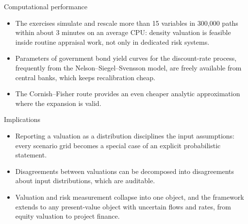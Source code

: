 \documentclass[aspectratio=169,11pt]{beamer}
\begin{document}
\begin{frame}{Computational performance}
  \begin{itemize}
    \item The exercises simulate and rescale more than 15 variables in
          300{,}000 paths within about 3 minutes on an average CPU: density
          valuation is feasible inside routine appraisal work, not only in
          dedicated risk systems.
    \item Parameters of government bond yield curves for the discount-rate
          process, frequently from the Nelson--Siegel--Svensson model, are
          freely available from central banks, which keeps recalibration
          cheap.
    \item The Cornish--Fisher route provides an even cheaper analytic
          approximation where the expansion is valid.
  \end{itemize}
\end{frame}

\begin{frame}{Implications}
  \begin{itemize}
    \item Reporting a valuation as a distribution disciplines the input
          assumptions: every scenario grid becomes a special case of an
          explicit probabilistic statement.
    \item Disagreements between valuations can be decomposed into
          disagreements about input distributions, which are auditable.
    \item Valuation and risk measurement collapse into one object, and the
          framework extends to any present-value object with uncertain
          flows and rates, from equity valuation to project finance.
  \end{itemize}
\end{frame}
\end{document}
